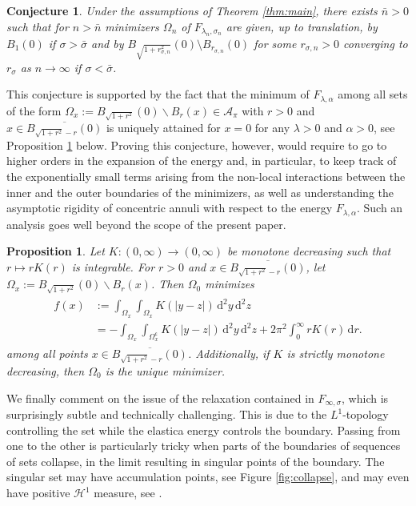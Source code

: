 \documentclass[11pt]{article}
\newcounter{statement}
\numberwithin{statement}{section}
\numberwithin{equation}{section}
\newtheorem{prop}[statement]{Proposition}
\newtheorem{conj}[statement]{Conjecture}
\theoremstyle{remark}
\newcommand{\intd}{\, \mathrm{d}} 				%
\newcommand{\stcomp}[1]{{#1}^{\mathsf{c}}}		%
\begin{document}
\begin{conj}
  Under the assumptions of Theorem \ref{thm:main}, there exists
  $\bar n>0$ such that for $n>\bar n$ minimizers $\Omega_n$ of
  $F_{\lambda_n,\sigma_n}$ are given, up to translation, by $B_1(0)$
  if $\sigma > \bar \sigma$ and by
  $B_{\sqrt{1+r_{\sigma,n}^2}}(0)\setminus B_{r_{\sigma,n}}(0) $ for
  some $r_{\sigma,n} >0$ converging to $r_{\sigma}$ as $n \to \infty$
  if $\sigma < \bar \sigma$.
\end{conj}
\noindent This conjecture is supported by the fact that the
  minimum of $F_{\lambda,\alpha}$ among all sets of the form
  $\Omega_x := B_{\sqrt{1 + r^2}} (0) \backslash B_r(x) \in \mathcal
  A_\pi$ with $r > 0$ and
  $x \in \overline {B_{\sqrt{1 + r^2} - r}(0)}$ is
  uniquely attained for $x = 0$ for any $\lambda > 0$ and
  $\alpha > 0$, see Proposition \ref{prop:centered} below.
  Proving this conjecture, however, would require to go to higher
  orders in the expansion of the energy and, in particular, to keep
  track of the exponentially small terms arising from the non-local
  interactions between the inner and the outer boundaries of the
  minimizers, as well as understanding the asymptotic rigidity of
  concentric annuli with respect to the energy
  $F_{\lambda,\alpha}$. Such an analysis goes well beyond the scope of
  the present paper.
  

  \begin{prop}\label{prop:centered}
    Let $K : (0,\infty) \to (0,\infty)$ be monotone decreasing such
    that $r \mapsto rK(r)$ is integrable.  For $r>0$ and
    $x \in \overline {B_{\sqrt{1 + r^2} - r}(0)}$, let
    $\Omega_x := B_{\sqrt{1 + r^2}} (0) \backslash B_r(x)$.  Then
    $\Omega_0$ minimizes
	\begin{align}
	  \begin{split}
            f(x) & := \int_{\Omega_x} \int_{\Omega_x}  K( |y-z|) \intd^2 y \intd^2 z\\
            & = - \int_{\Omega_x} \int_{\stcomp\Omega_x} K( |y-z|)
            \intd^2 y \intd^2 z + 2\pi^2 \int_0^\infty rK(r) \intd r.
	  \end{split}
	\end{align}
	among all points $x \in \overline {B_{\sqrt{1 + r^2} -
            r}(0)}$.  Additionally, if $K$ is strictly monotone
        decreasing, then $\Omega_0$ is the unique minimizer.
  \end{prop}
  
 
  We finally comment on the issue of the relaxation contained in
  $F_{\infty,\sigma}$, which is surprisingly subtle and technically
  challenging. This is due to the $L^1$-topology controlling the set
  while the elastica energy controls the boundary. Passing from one to
  the other is particularly tricky when parts of the boundaries of
  sequences of sets collapse, in the limit resulting in singular
  points of the boundary. The singular set may have accumulation
  points, see Figure \ref{fig:collapse}, and may even have positive
  $\mathcal{H}^1$ measure, see \cite[Example
  1]{bellettini1993semicontinuity}.
\end{document}
